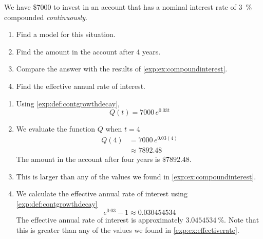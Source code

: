 			
\begin{pccexample}\label{exp:ex:compcont}
	We have \$7000 to invest in an account that has a nominal interest rate of \SI{3}{\percent} compounded 
	{\em continuously}. 
	\begin{enumerate}
		\item Find a model for this situation.
		\item Find the amount in the account after 4 years.
		\item Compare the answer with the results of \vref{exp:ex:compoundinterest}.
		\item Find the effective annual rate of interest.
	\end{enumerate}
	\begin{pccsolution}
		\begin{enumerate}
			\item Using \cref{exp:def:contgrowthdecay}, 
			\[
				Q(t) = 7000\,e^{0.03t}
			\]
			\item We evaluate the function $Q$ when $t=4$
			\begin{align*}
				Q(4) & =  7000\,e^{0.03(4)} \\
				     & \approx  7892.48     
			\end{align*}
			The amount in the account after four years is $\$7892.48$.
			\item This is larger than any of the values we found in \cref{exp:ex:compoundinterest}.
			\item We calculate the effective annual rate of interest using \cref{exp:def:contgrowthdecay}
			\[
				e^{0.03} -1 \approx 0.030454534
			\]
			The effective annual rate of interest is approximately $\SI{3.0454534}{\percent}$. Note that this is greater than any of the values we found in \vref{exp:ex:effectiverate}.
		\end{enumerate}
	\end{pccsolution}
\end{pccexample}
